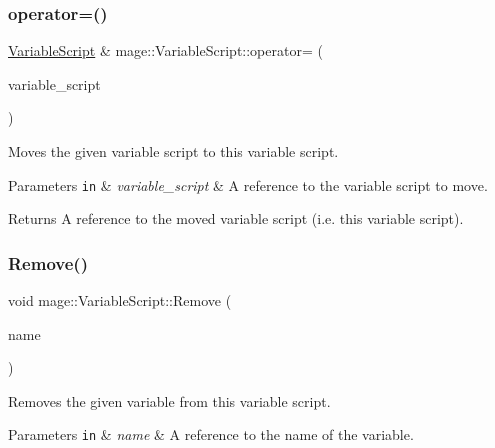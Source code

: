 \subsubsection{\texorpdfstring{operator=()}{operator=()}\hspace{0.1cm}{\footnotesize\ttfamily [2/2]}}
{\footnotesize\ttfamily \hyperlink{classmage_1_1_variable_script}{Variable\+Script} \& mage\+::\+Variable\+Script\+::operator= (\begin{DoxyParamCaption}\item[{\hyperlink{classmage_1_1_variable_script}{Variable\+Script} \&\&}]{variable\+\_\+script }\end{DoxyParamCaption})\hspace{0.3cm}{\ttfamily [noexcept]}}

Moves the given variable script to this variable script.


\begin{DoxyParams}[1]{Parameters}
\mbox{\tt in}  & {\em variable\+\_\+script} & A reference to the variable script to move. \\
\hline
\end{DoxyParams}
\begin{DoxyReturn}{Returns}
A reference to the moved variable script (i.\+e. this variable script). 
\end{DoxyReturn}
\hypertarget{classmage_1_1_variable_script_aac74a9edbe78e0caa1095ce32835501d}{}\label{classmage_1_1_variable_script_aac74a9edbe78e0caa1095ce32835501d} 
\subsubsection{\texorpdfstring{Remove()}{Remove()}}
{\footnotesize\ttfamily void mage\+::\+Variable\+Script\+::\+Remove (\begin{DoxyParamCaption}\item[{const string \&}]{name }\end{DoxyParamCaption})}

Removes the given variable from this variable script.


\begin{DoxyParams}[1]{Parameters}
\mbox{\tt in}  & {\em name} & A reference to the name of the variable. \\
\hline
\end{DoxyParams}
\hypertarget{classmage_1_1_variable_script_add51955d83e85e6d6acd82cfe40bed26}{}\label{classmage_1_1_variable_script_add51955d83e85e6d6acd82cfe40bed26} 
